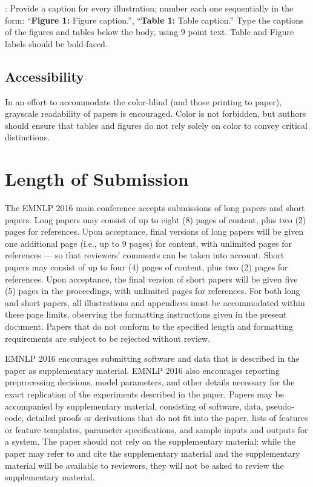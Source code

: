 \documentclass[11pt,letterpaper]{article}
\begin{document}
: Provide a caption for every illustration; number each one
sequentially in the form:  ``{\bf Figure 1:} Figure caption.'',
``{\bf Table 1:} Table caption.''  Type the captions of the figures and tables
below the body, using 9 point text. Table and Figure labels should be
bold-faced.

\subsection{Accessibility}
\label{ssec:accessibility}

In an effort to accommodate the color-blind (and those printing to paper),
grayscale readability of papers is encouraged. Color is not forbidden, but 
authors should ensure that tables and figures do not rely solely on color to
convey critical distinctions.

\section{Length of Submission}
\label{sec:length}

The EMNLP 2016 main conference accepts submissions of long papers and
short papers.  Long papers may consist of up to eight (8) pages of content, plus
two (2) pages for references. Upon acceptance, final versions of long papers
will be given one additional page (i.e., up to 9 pages) for content, with
unlimited pages for references --- so that reviewers' comments can be taken
into account.  Short papers may consist of up to four (4) pages of content,
plus two (2) pages for references. Upon acceptance, the final version of
short papers will be given five (5) pages in the proceedings, with unlimited
pages for references.  For both long and short papers, all illustrations and
appendices must be accommodated within these page limits, observing the
formatting instructions given in the present document.  Papers that do not
conform to the specified length and formatting requirements are subject to
be rejected without review.

EMNLP 2016 encourages submitting software and data that is described in the
paper as supplementary material. EMNLP 2016 also encourages reporting
preprocessing decisions, model parameters, and other details necessary for the
exact replication of the experiments described in the paper. Papers may be
accompanied by supplementary material, consisting of software, data, pseudo-code,
detailed proofs or derivations that do not fit into the paper, lists of features
or feature templates, parameter specifications, and sample inputs and outputs
for a system. The paper should not rely on the supplementary material: while the
paper may refer to and cite the supplementary material and the supplementary
material will be available to reviewers, they will not be asked to review the
supplementary material.
\end{document}
